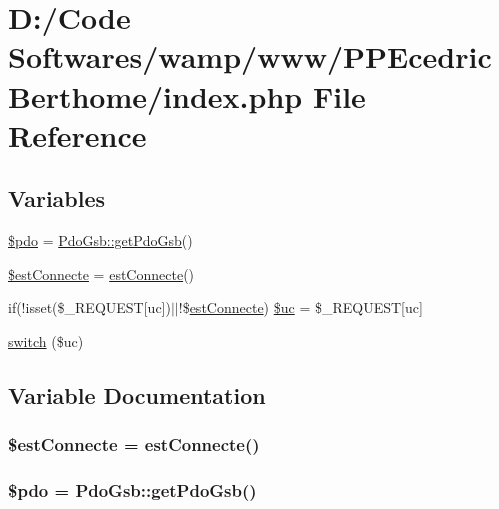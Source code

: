 \hypertarget{index_8php}{}\section{D\+:/\+Code Softwares/wamp/www/\+P\+P\+Ecedric\+Berthome/index.php File Reference}
\label{index_8php}
\subsection*{Variables}
\begin{DoxyCompactItemize}
\item 
\hyperlink{index_8php_a5766efd703cef0e00bfc06b3f3acbe0e}{\$pdo} = \hyperlink{class_pdo_gsb_a37ab3ed998137aeaf4d581365520067e}{Pdo\+Gsb\+::get\+Pdo\+Gsb}()
\item 
\hyperlink{index_8php_af0f433921c4625f043de9faebb5b7bbe}{\$est\+Connecte} = \hyperlink{include_2fct_8inc_8php_a80ca5386d53e29b2b310cb83191a9b31}{est\+Connecte}()
\item 
if(!isset(\$\+\_\+\+R\+E\+Q\+U\+E\+ST\mbox{[}\textquotesingle{}uc\textquotesingle{}\mbox{]})$\vert$$\vert$!\$\hyperlink{include_2fct_8inc_8php_a80ca5386d53e29b2b310cb83191a9b31}{est\+Connecte}) \hyperlink{index_8php_a85772ca7b85c824f39906410cb9c74e3}{\$uc} = \$\+\_\+\+R\+E\+Q\+U\+E\+ST\mbox{[}\textquotesingle{}uc\textquotesingle{}\mbox{]}
\item 
\hyperlink{index_8php_a6160ae6d9a60bbcc19780fa9bc2c9b41}{switch} (\$uc)
\end{DoxyCompactItemize}


\subsection{Variable Documentation}
\subsubsection[{\texorpdfstring{\$est\+Connecte}{$estConnecte}}]{\setlength{\rightskip}{0pt plus 5cm}\${\bf est\+Connecte} = {\bf est\+Connecte}()}\hypertarget{index_8php_af0f433921c4625f043de9faebb5b7bbe}{}\label{index_8php_af0f433921c4625f043de9faebb5b7bbe}
\subsubsection[{\texorpdfstring{\$pdo}{$pdo}}]{\setlength{\rightskip}{0pt plus 5cm}\$pdo = {\bf Pdo\+Gsb\+::get\+Pdo\+Gsb}()}\hypertarget{index_8php_a5766efd703cef0e00bfc06b3f3acbe0e}{}\label{index_8php_a5766efd703cef0e00bfc06b3f3acbe0e}
